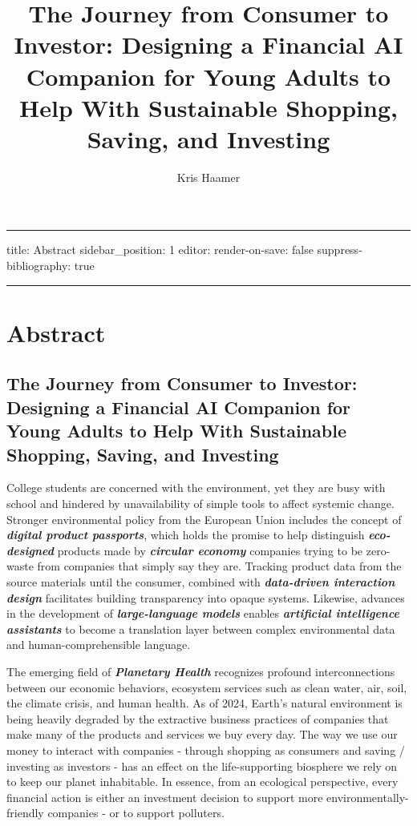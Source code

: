 \documentclass[
  letterpaper,
  DIV=11,
  numbers=noendperiod]{scrartcl}
\title{The Journey from Consumer to Investor: Designing a Financial AI
Companion for Young Adults to Help With Sustainable Shopping, Saving,
and Investing}
\author{Kris Haamer}
\date{}
\renewcommand*\contentsname{Table of contents}
\newcommand\contentsname{Table of contents}
\begin{document}
\maketitle

\renewcommand*\contentsname{Table of contents}
{
\hypersetup{linkcolor=}
\setcounter{tocdepth}{3}
\tableofcontents
}
\newpage

\begin{center}\rule{0.5\linewidth}{0.5pt}\end{center}

title: Abstract sidebar\_position: 1 editor: render-on-save: false
suppress-bibliography: true

\begin{center}\rule{0.5\linewidth}{0.5pt}\end{center}

\section{Abstract}\label{abstract}

\subsection{The Journey from Consumer to Investor: Designing a Financial
AI Companion for Young Adults to Help With Sustainable Shopping, Saving,
and
Investing}\label{the-journey-from-consumer-to-investor-designing-a-financial-ai-companion-for-young-adults-to-help-with-sustainable-shopping-saving-and-investing}

College students are concerned with the environment, yet they are busy
with school and hindered by unavailability of simple tools to affect
systemic change. Stronger environmental policy from the European Union
includes the concept of \textbf{\emph{digital product passports}}, which
holds the promise to help distinguish \textbf{\emph{eco-designed}}
products made by \textbf{\emph{circular economy}} companies trying to be
zero-waste from companies that simply say they are. Tracking product
data from the source materials until the consumer, combined with
\textbf{\emph{data-driven interaction design}} facilitates building
transparency into opaque systems. Likewise, advances in the development
of \textbf{\emph{large-language models}} enables
\textbf{\emph{artificial intelligence assistants}} to become a
translation layer between complex environmental data and
human-comprehensible language.

The emerging field of \textbf{\emph{Planetary Health}} recognizes
profound interconnections between our economic behaviors, ecosystem
services such as clean water, air, soil, the climate crisis, and human
health. As of 2024, Earth's natural environment is being heavily
degraded by the extractive business practices of companies that make
many of the products and services we buy every day. The way we use our
money to interact with companies - through shopping as consumers and
saving / investing as investors - has an effect on the life-supporting
biosphere we rely on to keep our planet inhabitable. In essence, from an
ecological perspective, every financial action is either an investment
decision to support more environmentally-friendly companies - or to
support polluters.
\end{document}
